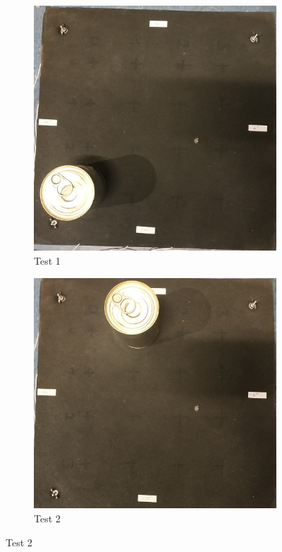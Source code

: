 \begin{figure} [!h]
  \begin{subfigure}[b]{0.5\linewidth}
    \centering
    \includegraphics[width=0.75\linewidth]{img/badanie0_1.jpg} 
    \caption{Test 1} 
  \end{subfigure}%
  \begin{subfigure}[b]{0.5\linewidth}
    \centering
    \includegraphics[width=0.75\linewidth]{img/badanie0_2.jpg}
    \caption{Test 2} 
  \end{subfigure} 
  

\end{figure}
